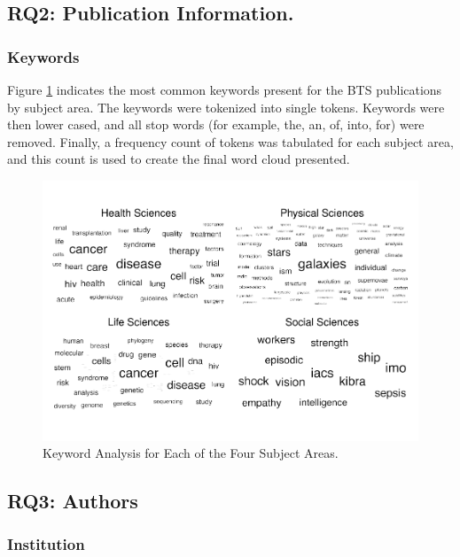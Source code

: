 \documentclass[
  man,mask,floatsintext]{apa7}
\begin{document}
\hypertarget{rq2-publication-information.-1}{%
\subsection{RQ2: Publication Information.}\label{rq2-publication-information.-1}}

\hypertarget{keywords}{%
\subsubsection{Keywords}\label{keywords}}

Figure \ref{fig:fig-keywords} indicates the most common keywords present for the BTS publications by subject area. The keywords were tokenized into single tokens. Keywords were then lower cased, and all stop words (for example, the, an, of, into, for) were removed. Finally, a frequency count of tokens was tabulated for each subject area, and this count is used to create the final word cloud presented.

\begin{figure}
\centering
\includegraphics{manuscript_scopus_files/figure-latex/fig-keywords-1.pdf}
\caption{\label{fig:fig-keywords}Keyword Analysis for Each of the Four Subject Areas.}
\end{figure}

\hypertarget{rq3-authors}{%
\subsection{RQ3: Authors}\label{rq3-authors}}

\hypertarget{institution}{%
\subsubsection{Institution}\label{institution}}
\end{document}
